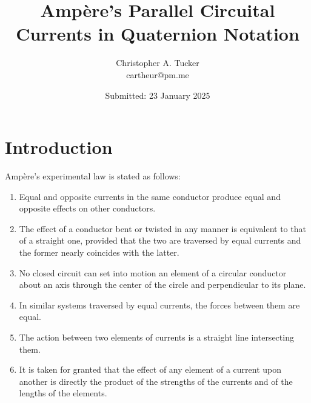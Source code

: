 \documentclass[]{article}
\begin{document}
\title{Amp\`ere's Parallel Circuital Currents in Quaternion Notation}

\author{Christopher A. Tucker\\cartheur@pm.me\\}

\date{Submitted: 23 January 2025}

\maketitle


\section{Introduction}
Amp\`ere's experimental law is stated as follows:

\begin{enumerate}
  \item Equal and opposite currents in the same conductor produce equal and opposite effects on other conductors.
  \item The effect of a conductor bent or twisted in any manner is equivalent to that of a straight one, provided that the two are traversed by equal currents and the former nearly coincides with the latter.
  \item No closed circuit can set into motion an element of a circular conductor about an axis through the center of the circle and perpendicular to its plane.
  \item In similar systems traversed by equal currents, the forces between them are equal.
  \item The action between two elements of currents is a straight line intersecting them.
  \item It is taken for granted that the effect of any element of a current upon another is directly the product of the strengths of the currents and of the lengths of the elements.
\end{enumerate}
\end{document}
